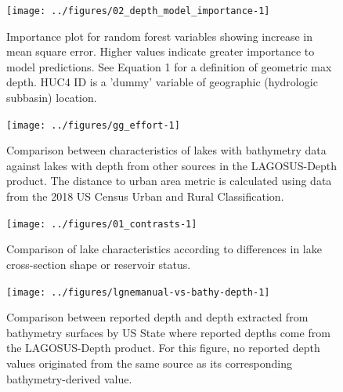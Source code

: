 \documentclass[draft,wrr]{agutexSI2019}
\begin{document}
\begin{figure}
      \noindent\texttt{[image: ../figures/02\_depth\_model\_importance-1]}
      \caption{Importance plot for random forest variables showing increase in mean square error. Higher values indicate greater importance to model predictions. See Equation 1 for a definition of geometric max depth. HUC4 ID is a 'dummy' variable of geographic (hydrologic subbasin) location.}\label{figS7}
\end{figure}

\begin{figure}
      \begin{center}\texttt{[image: ../figures/gg\_effort-1]}\end{center}
      \caption{Comparison between characteristics of lakes with bathymetry data against lakes with depth from other sources in the LAGOSUS-Depth product. The distance to urban area metric is calculated using data from the 2018 US Census Urban and Rural Classification.}\label{figS8}
\end{figure}

\clearpage
\begin{figure}
      \begin{center}\texttt{[image: ../figures/01\_contrasts-1]}\end{center}
      \caption{Comparison of lake characteristics according to differences in lake cross-section shape or reservoir status.}\label{figS9}
\end{figure}

\clearpage

\begin{figure}
      \begin{center}\texttt{[image: ../figures/lgnemanual-vs-bathy-depth-1]}\end{center}
      \caption{Comparison between reported depth and depth extracted from bathymetry surfaces by US State where reported depths come from the LAGOSUS-Depth product. For this figure, no reported depth values originated from the same source as its corresponding bathymetry-derived value.}\label{figS10}
\end{figure}

\clearpage
\end{document}
